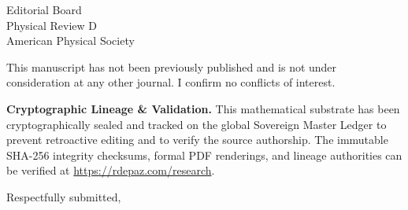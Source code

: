 \documentclass[12pt, a4paper]{letter}
\begin{document}
\begin{letter}{Editorial Board \\ Physical Review D \\ American Physical Society}
\medskip

This manuscript has not been previously published and is not under consideration
at any other journal. I confirm no conflicts of interest.

\textbf{Cryptographic Lineage \& Validation.} This mathematical substrate has been cryptographically sealed and tracked on the global Sovereign Master Ledger to prevent retroactive editing and to verify the source authorship. The immutable SHA-256 integrity checksums, formal PDF renderings, and lineage authorities can be verified at \url{https://rdepaz.com/research}.

\medskip

\closing{Respectfully submitted,}
\end{letter}
\end{document}
